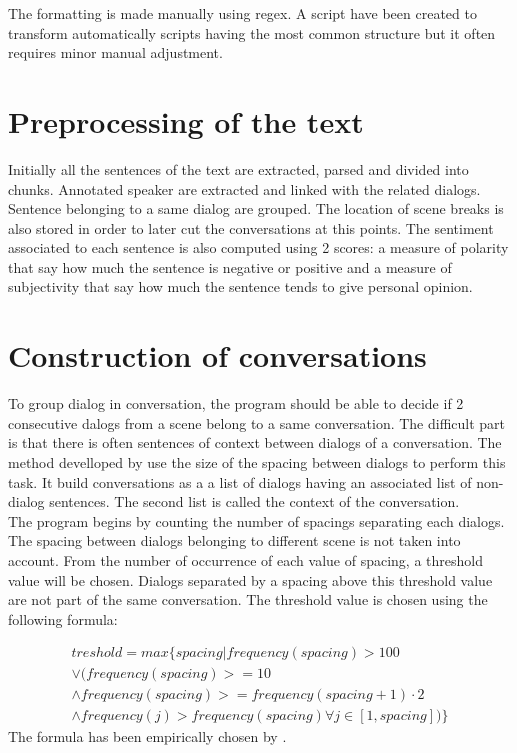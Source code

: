 \documentclass[a4paper, 12pt]{report}
\begin{document}
The formatting is made manually using regex. A script have been created to transform automatically scripts having the most common structure  but it often requires minor manual adjustment.

\section{Preprocessing of the text}
Initially all the sentences of the text are extracted, parsed and divided into chunks. Annotated speaker are extracted and linked with the related dialogs. Sentence belonging to a same dialog are grouped. The location of scene breaks is also stored in order to later cut the conversations at this points. The sentiment associated to each sentence is also computed using 2 scores: a measure of polarity that say how much the sentence is negative or positive and a measure of subjectivity that say how much the sentence tends to give personal opinion.

\section{Construction of conversations}
To group dialog in conversation, the program should be able to decide if 2 consecutive dalogs from a scene belong to a same conversation. The difficult part is that there is often sentences of context between dialogs of a conversation. The method develloped by \cite{original_thesis} use the size of the spacing between dialogs to perform this task. It build conversations as a a list of dialogs having an associated list of non-dialog sentences. The second list is called the context of the conversation.\\
The program begins by counting the number of spacings separating each dialogs. The spacing between dialogs belonging to different scene is not taken into account. From the number of occurrence of each value of spacing, a threshold value will be chosen. Dialogs separated by a spacing above this threshold value are not part of the same conversation. The threshold value is chosen using the following formula:

\begin{equation}
\begin{split}	
treshold = max\{spacing | frequency(spacing) > 100 \\
\vee (frequency(spacing) >= 10 \\
\wedge frequency(spacing) >= frequency(spacing + 1) \cdot 2 \\
\wedge frequency(j) > frequency(spacing) \forall j \in [1,spacing])\}
	 \end{split}
\end{equation}
The formula has been empirically chosen by \cite{original_thesis}.
\end{document}
